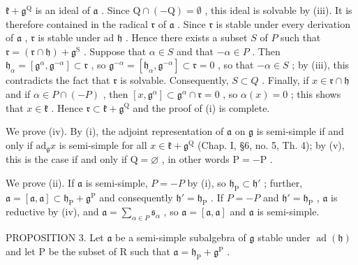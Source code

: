 \(\mathfrak{k} + \mathfrak{g}^{\mathrm{Q}}\) is an ideal of \(\mathfrak{a}\) . Since \(\mathrm{Q} \cap (-\mathrm{Q}) = \emptyset\) , this ideal is solvable by (iii). It is therefore contained in the radical \(\mathfrak{r}\) of \(\mathfrak{a}\) . Since \(\mathfrak{r}\) is stable under every derivation of \(\mathfrak{a}\) , \(\mathfrak{r}\) is stable under ad \(\mathfrak{h}\) . Hence there exists a subset \(S\) of \(P\) such that \(\mathfrak{r} = (\mathfrak{r} \cap \mathfrak{h}) + \mathfrak{g}^{\mathrm{S}}\) . Suppose that \(\alpha \in S\) and that \(-\alpha \in P\) . Then \(\mathfrak{h}_{\alpha} = [\mathfrak{g}^{\alpha}, \mathfrak{g}^{-\alpha}] \subset \mathfrak{r}\) , so \(\mathfrak{g}^{-\alpha} = [\mathfrak{h}_{\alpha}, \mathfrak{g}^{-\alpha}] \subset \mathfrak{r} = 0\) , so that \(-\alpha \in S\) ; by (iii), this contradicts the fact that \(\mathfrak{r}\) is solvable. Consequently, \(S \subset Q\) . Finally, if \(x \in \mathfrak{r} \cap \mathfrak{h}\) and if \(\alpha \in P \cap (-P)\) , then \([x, \mathfrak{g}^{\alpha}] \subset \mathfrak{g}^{\alpha} \cap \mathfrak{r} = 0\) , so \(\alpha(x) = 0\) ; this shows that \(x \in \mathfrak{k}\) . Hence \(\mathfrak{r} \subset \mathfrak{k} + \mathfrak{g}^{\mathrm{Q}}\) and the proof of (i) is complete.

We prove (iv). By (i), the adjoint representation of \(\mathfrak{a}\) on \(\mathfrak{g}\) is semi-simple if and only if \(\mathrm{ad}_{\mathfrak{g}}x\) is semi-simple for all \(x\in \mathfrak{k} + \mathfrak{g}^{\mathrm{Q}}\) (Chap. I, §6, no. 5, Th. 4); by (v), this is the case if and only if \(\mathrm{Q} = \varnothing\) , in other words \(\mathrm{P} = -\mathrm{P}\) .

We prove (ii). If \(\mathfrak{a}\) is semi-simple, \(P = -P\) by (i), so \(\mathfrak{h}_{\mathrm{P}} \subset \mathfrak{h}'\) ; further, \(\mathfrak{a} = [\mathfrak{a}, \mathfrak{a}] \subset \mathfrak{h}_{\mathrm{P}} + \mathfrak{g}^{\mathrm{P}}\) and consequently \(\mathfrak{h}' = \mathfrak{h}_{\mathrm{P}}\) . If \(P = -P\) and \(\mathfrak{h}' = \mathfrak{h}_{\mathrm{P}}\) , \(\mathfrak{a}\) is reductive by (iv), and \(\mathfrak{a} = \sum_{\alpha \in P} \mathfrak{s}_{\alpha}\) , so \(\mathfrak{a} = [\mathfrak{a}, \mathfrak{a}]\) and \(\mathfrak{a}\) is semi-simple.

PROPOSITION 3. Let \(\mathfrak{a}\) be a semi-simple subalgebra of \(\mathfrak{g}\) stable under \(\operatorname{ad}(\mathfrak{h})\) and let \(\mathrm{P}\) be the subset of \(\mathrm{R}\) such that \(\mathfrak{a} = \mathfrak{h}_{\mathrm{P}} + \mathfrak{g}^{\mathrm{P}}\) .

